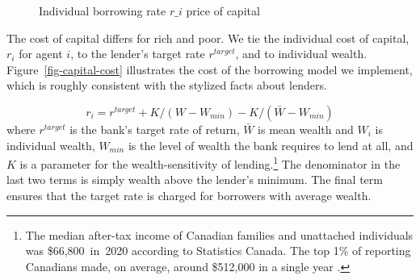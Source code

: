 {    \begin{figure}
    \centering
    \label{fig-capital-cost}
    \caption{Individual borrowing rate $r\_i$ price of capital}
    \label{fig:Wealth-based}
    \end{figure}

The cost of capital differs for rich and poor. We tie the individual cost of capital,  $r_i$ for agent $i$, to the lender's target rate $r^{target}$, and to individual wealth. Figure~\ref{fig-capital-cost} illustrates the cost of the borrowing model we implement, which is  roughly consistent  with the stylized facts about lenders. 
 
\begin{equation}
r_i = r^{target}+ K/(W-W_{min}) -K/(\bar W - W_{min})\label{eqn-interest-wealth-relationship}
\end{equation}
where  $r^{target}$ is the bank's target rate of return,  $\bar{W}$ is mean wealth and $W_i$ is individual wealth, $W_{min}$ is the level of wealth the bank requires to lend at all, and $K$ is a parameter for the wealth-sensitivity of lending.\footnote{The median after-tax income of Canadian families and unattached individuals was \$66,800 in 2020 according to Statistics Canada. %
 The top 1\% of reporting Canadians made, on average, around \$512,000 in a single year \cite{WEB_model-stats-can-canadian-incomes}. %
} The denominator in the last two terms is simply wealth above the lender's minimum. The final term ensures that the target rate is charged for borrowers with average wealth.




}



